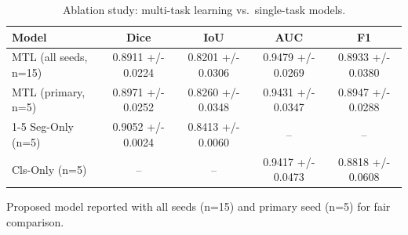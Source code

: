 \begin{table}[htbp]
  \centering
  \caption{Ablation study: multi-task learning vs.\ single-task models.}
  \label{tab:ablation_mtl}
  \begin{tabular}{lcccc}
    \toprule
    Model & Dice & IoU & AUC & F1 \\
    \midrule
    MTL (all seeds, n=15) & 0.8911 +/- 0.0224 & 0.8201 +/- 0.0306 & 0.9479 +/- 0.0269 & 0.8933 +/- 0.0380 \\
    MTL (primary, n=5) & 0.8971 +/- 0.0252 & 0.8260 +/- 0.0348 & 0.9431 +/- 0.0347 & 0.8947 +/- 0.0288 \\
    \cmidrule(lr){1-5}
    Seg-Only (n=5) & 0.9052 +/- 0.0024 & 0.8413 +/- 0.0060 & -- & -- \\
    Cls-Only (n=5) & -- & -- & 0.9417 +/- 0.0473 & 0.8818 +/- 0.0608 \\
    \bottomrule
  \end{tabular}
  \vspace{2pt}
  \footnotesize{Proposed model reported with all seeds (n=15) and primary seed (n=5) for fair comparison.}
\end{table}